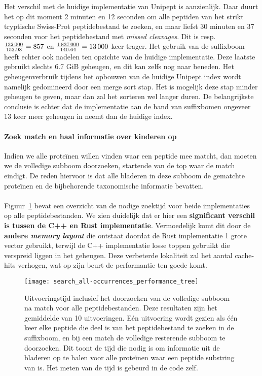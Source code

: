Het verschil met de huidige implementatie van Unipept is aanzienlijk.
Daar duurt het op dit moment 2 minuten en 12 seconden om alle peptiden van het strikt tryptische Swiss-Prot peptidebestand te zoeken,
en maar liefst 30 minuten en 37 seconden voor het peptidebestand met \textit{missed cleavages}.
Dit is resp.~$\frac{132\thinspace000}{152.98} = 857$ en $\frac{1\thinspace837\thinspace000}{140.64} = 13\thinspace000$ keer trager.
Het gebruik van de suffixboom heeft echter ook nadelen ten opzichte van de huidige implementatie.
Deze laatste gebruikt slechts 6.7 GiB geheugen, en dit kan zelfs nog naar beneden.
Het geheugenverbruik tijdens het opbouwen van de huidige Unipept index wordt namelijk gedomineerd door een merge sort stap.
Het is mogelijk deze stap minder geheugen te geven, maar dan zal het sorteren wel langer duren.
De belangrijkste conclusie is echter dat de implementatie aan de hand van suffixbomen ongeveer 13 keer meer geheugen in neemt dan de huidige index.

\paragraph{Zoek match en haal informatie over kinderen op}
Indien we alle proteïnen willen vinden waar een peptide mee matcht, dan moeten we de volledige subboom doorzoeken, startende van de top waar de match eindigt.
De reden hiervoor is dat alle bladeren in deze subboom de gematchte proteïnen en de bijbehorende taxonomische informatie bevatten.
\\ \\
Figuur~\ref{fig:performance_all-occurrences_tree} bevat een overzicht van de nodige zoektijd voor beide implementaties op alle peptidebestanden.
We zien duidelijk dat er hier een \textbf{significant verschil is tussen de C++ en Rust implementatie}.
Vermoedelijk komt dit door de \textbf{andere \textit{memory layout}} die ontstaat doordat de Rust implementatie 1 grote vector gebruikt, terwijl de C++ implementatie losse toppen gebruikt die verspreid liggen in het geheugen.
Deze verbeterde lokaliteit zal het aantal cache-hits verhogen, wat op zijn beurt de performantie ten goede komt.

\begin{figure}[ht]
    \centering
    \texttt{[image: search\_all-occurrences\_performance\_tree]}
    \caption{Uitvoeringstijd inclusief het doorzoeken van de volledige subboom na match voor alle peptidebestanden. Deze resultaten zijn het gemiddelde van 10 uitvoeringen. Eén uitvoering wordt gezien als één keer elke peptide die deel is van het peptidebestand te zoeken in de suffixboom, en bij een match de volledige resterende subboom te doorzoeken. Dit toont de tijd die nodig is om informatie uit de bladeren op te halen voor alle proteïnen waar een peptide substring van is. Het meten van de tijd is gebeurd in de code zelf.}
    \label{fig:performance_all-occurrences_tree}
\end{figure}


